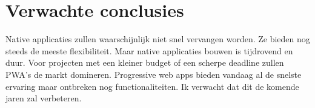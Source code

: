 \section{Verwachte conclusies}
\label{sec:verwachte_conclusies}

Native applicaties zullen waarschijnlijk niet snel vervangen worden. Ze bieden nog steeds de meeste flexibiliteit. Maar native applicaties bouwen is tijdrovend en duur. 
Voor projecten met een kleiner budget of een scherpe deadline zullen PWA’s de markt domineren.
Progressive web apps bieden vandaag al de snelste ervaring maar ontbreken nog functionaliteiten. Ik verwacht dat dit de komende jaren zal verbeteren.


